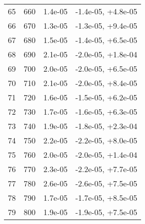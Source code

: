 \begin{table}
\begin{adjustbox}{width=1\textwidth/2}
\begin{tabular}{|c|c|c|c|}
\cline{1-4}
65 & 660 & 1.4e-05 & -1.4e-05, +4.8e-05 \\
\cline{1-4}
66 & 670 & 1.3e-05 & -1.3e-05, +9.4e-05 \\
\cline{1-4}
67 & 680 & 1.5e-05 & -1.4e-05, +6.5e-05 \\
\cline{1-4}
68 & 690 & 2.1e-05 & -2.0e-05, +1.8e-04 \\
\cline{1-4}
69 & 700 & 2.0e-05 & -2.0e-05, +6.5e-05 \\
\cline{1-4}
70 & 710 & 2.1e-05 & -2.0e-05, +8.4e-05 \\
\cline{1-4}
71 & 720 & 1.6e-05 & -1.5e-05, +6.2e-05 \\
\cline{1-4}
72 & 730 & 1.7e-05 & -1.6e-05, +6.3e-05 \\
\cline{1-4}
73 & 740 & 1.9e-05 & -1.8e-05, +2.3e-04 \\
\cline{1-4}
74 & 750 & 2.2e-05 & -2.2e-05, +8.0e-05 \\
\cline{1-4}
75 & 760 & 2.0e-05 & -2.0e-05, +1.4e-04 \\
\cline{1-4}
76 & 770 & 2.3e-05 & -2.2e-05, +7.7e-05 \\
\cline{1-4}
77 & 780 & 2.6e-05 & -2.6e-05, +7.5e-05 \\
\cline{1-4}
78 & 790 & 1.7e-05 & -1.7e-05, +8.5e-05 \\
\cline{1-4}
79 & 800 & 1.9e-05 & -1.9e-05, +7.5e-05 \\
\cline{1-4}
\end{tabular}
\end{adjustbox}
\end{table}

